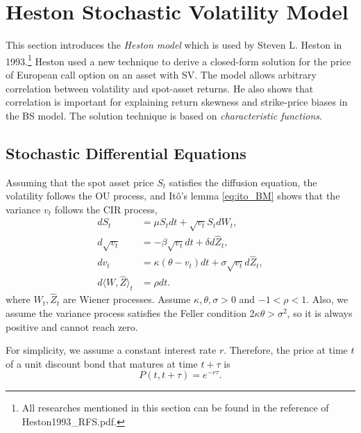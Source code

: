 \documentclass[a4paper,12pt]{article}
\numberwithin{equation}{section}
\theoremstyle{definition}
\theoremstyle{remark}
\begin{document}
\newpage
\section{Heston Stochastic Volatility Model}\label{sec:Heston}
This section introduces the \textit{Heston model} which is used by 
Steven L. Heston in 1993.\footnote{All researches mentioned in this 
section can be found in the reference of Heston1993\_RFS.pdf.} 
Heston used a new technique to derive a closed-form solution for 
the price of European call option on an asset with SV. The model 
allows arbitrary correlation between volatility and spot-asset 
returns. He also shows that correlation is important for explaining 
return skewness and strike-price biases in the BS model. The 
solution technique is based on \textit{characteristic functions}.

\subsection{Stochastic Differential Equations}
Assuming that the spot asset price $S_t$ satisfies the diffusion 
equation, the volatility follows the OU process, and It\^o's lemma 
\eqref{eq:ito_BM} shows that the variance $v_{t}$ follows the CIR 
process, 
\begin{equation}
\label{eq:Heston_SDE}
\begin{split}
    dS_{t}&=\mu S_{t}dt+\sqrt{v_{t}}S_{t}dW_{t}, \\
    d\sqrt{v_{t}}&=-\beta\sqrt{v_{t}}dt+\delta d\hat{Z}_{t}, \\
    dv_{t}&=\kappa(\theta-v_{t})dt+\sigma\sqrt{v_{t}}d\hat{Z}_{t}, \\
    d\langle W,\hat{Z}\rangle_{t}&=\rho dt.
\end{split}
\end{equation}
where $W_{t},\hat{Z}_{t}$ are Wiener processes. Assume $\kappa,\theta,\sigma>0$ 
and $-1<\rho<1$. Also, we assume the variance process satisfies 
the Feller condition $2\kappa\theta>\sigma^{2}$, so it is always 
positive and cannot reach zero.

For simplicity, we assume a constant interest rate $r$. Therefore, 
the price at time $t$ of a unit discount bond that matures at time 
$t+\tau$ is 
\begin{equation}
\label{eq:Heston_riskless}
    P(t,t+\tau)=e^{-r\tau}.
\end{equation}
\end{document}
